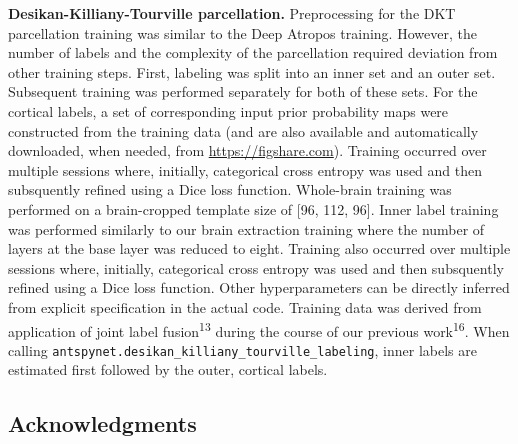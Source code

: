 \documentclass[12pt,]{article}
\begin{document}
\textbf{Desikan-Killiany-Tourville parcellation.} Preprocessing for the
DKT parcellation training was similar to the Deep Atropos training.
However, the number of labels and the complexity of the parcellation
required deviation from other training steps. First, labeling was split
into an inner set and an outer set. Subsequent training was performed
separately for both of these sets. For the cortical labels, a set of
corresponding input prior probability maps were constructed from the
training data (and are also available and automatically downloaded, when
needed, from \url{https://figshare.com}). Training occurred over
multiple sessions where, initially, categorical cross entropy was used
and then subsquently refined using a Dice loss function. Whole-brain
training was performed on a brain-cropped template size of {[}96, 112,
96{]}. Inner label training was performed similarly to our brain
extraction training where the number of layers at the base layer was
reduced to eight. Training also occurred over multiple sessions where,
initially, categorical cross entropy was used and then subsquently
refined using a Dice loss function. Other hyperparameters can be
directly inferred from explicit specification in the actual code.
Training data was derived from application of joint label
fusion\textsuperscript{13} during the course of our previous
work\textsuperscript{16}. When calling
\texttt{antspynet.desikan\_killiany\_tourville\_labeling}, inner labels
are estimated first followed by the outer, cortical labels.

\clearpage

\hypertarget{acknowledgments}{%
\subsection*{Acknowledgments}\label{acknowledgments}}
\end{document}
